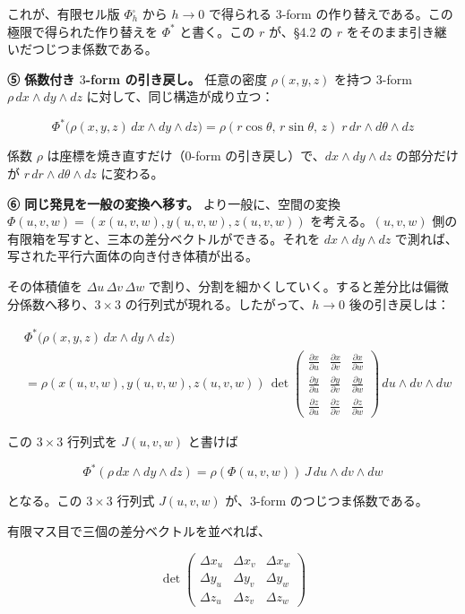 \documentclass[a4paper,12pt,openany]{book}
\begin{document}
これが、有限セル版 \(\Phi_h^\square\) から \(h\to0\) で得られる
\(3\)-form の作り替えである。この極限で得られた作り替えを \(\Phi^*\)
と書く。この \(r\) が、§4.2 の \(r\)
をそのまま引き継いだつじつま係数である。

\textbf{⑤ 係数付き $3$-form の引き戻し。} 任意の密度 \(\rho(x,y,z)\)
を持つ \(3\)-form \(\rho\,dx \wedge dy \wedge dz\)
に対して、同じ構造が成り立つ：

\[\Phi^*\bigl(\rho(x,y,z)\,dx \wedge dy \wedge dz\bigr) = \rho(r\cos\theta,\, r\sin\theta,\, z)\; r\,dr \wedge d\theta \wedge dz\]

係数 \(\rho\) は座標を焼き直すだけ（\(0\)-form
の引き戻し）で、\(dx \wedge dy \wedge dz\) の部分だけが
\(r\,dr \wedge d\theta \wedge dz\) に変わる。

\textbf{⑥ 同じ発見を一般の変換へ移す。} より一般に、空間の変換
\(\Phi(u,v,w) = (x(u,v,w), y(u,v,w), z(u,v,w))\) を考える。\((u,v,w)\)
側の有限箱を写すと、三本の差分ベクトルができる。それを
\(dx\wedge dy\wedge dz\)
で測れば、写された平行六面体の向き付き体積が出る。

その体積値を \(\Delta u\,\Delta v\,\Delta w\)
で割り、分割を細かくしていく。すると差分比は偏微分係数へ移り、\(3\times3\)
の行列式が現れる。したがって、\(h\to0\) 後の引き戻しは：

\[
\begin{aligned}
&\Phi^*\bigl(\rho(x,y,z)\,dx \wedge dy \wedge dz\bigr) \\
&= \rho(x(u,v,w), y(u,v,w), z(u,v,w))\,
\det\!\begin{pmatrix}
\frac{\partial x}{\partial u} & \frac{\partial x}{\partial v} & \frac{\partial x}{\partial w} \\[6pt]
\frac{\partial y}{\partial u} & \frac{\partial y}{\partial v} & \frac{\partial y}{\partial w} \\[6pt]
\frac{\partial z}{\partial u} & \frac{\partial z}{\partial v} & \frac{\partial z}{\partial w}
\end{pmatrix}
\,du \wedge dv \wedge dw
\end{aligned}
\]

この \(3 \times 3\) 行列式を \(J(u,v,w)\) と書けば

\[\Phi^*(\rho\,dx \wedge dy \wedge dz) = \rho(\Phi(u,v,w))\,J\,du \wedge dv \wedge dw\]

となる。この \(3\times3\) 行列式 \(J(u,v,w)\) が、\(3\)-form
のつじつま係数である。

有限マス目で三個の差分ベクトルを並べれば、

\[\det\!\begin{pmatrix}
\Delta x_u & \Delta x_v & \Delta x_w \\[2pt]
\Delta y_u & \Delta y_v & \Delta y_w \\[2pt]
\Delta z_u & \Delta z_v & \Delta z_w
\end{pmatrix}\]
\end{document}

